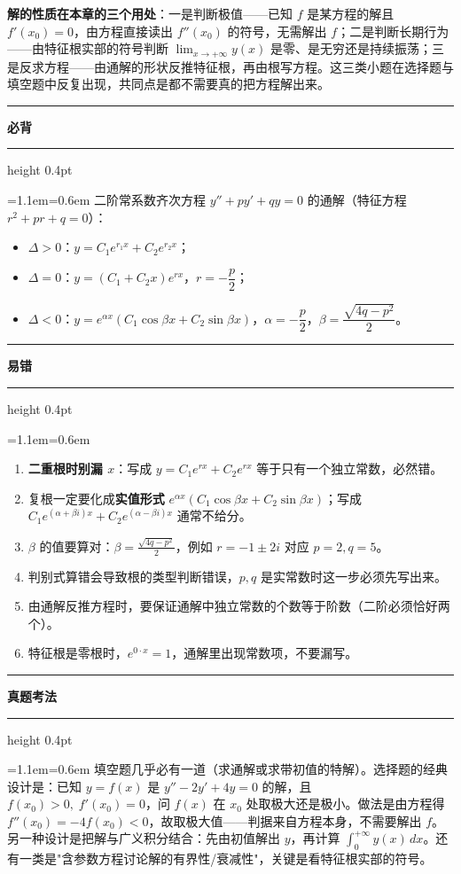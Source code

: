 \documentclass[11pt,openany,UTF8]{ctexbook}
\newcommand{\callouthead}[2]{%
  \par\addvspace{7pt}\noindent
  {\color{#1}\rule[-0.15em]{3pt}{1.05em}}\hspace{0.5em}%
  {\bfseries\color{#1}#2}\par\nobreak\vspace{-0.35em}%
  {\color{rulesep}\hrule height 0.4pt}\nobreak\vspace{0.45em}%
  \begingroup\small\setlength{\parindent}{0pt}%
  \leftskip=1.1em\rightskip=0.6em\noindent\ignorespaces}
\newcommand{\calloutend}{\par\endgroup\addvspace{7pt}}
\newenvironment{callkey}[1]{\callouthead{keybar}{#1}}{\calloutend}
\newenvironment{callwarn}[1]{\callouthead{warnbar}{#1}}{\calloutend}
\newenvironment{callexam}[1]{\callouthead{exambar}{#1}}{\calloutend}
\begin{document}
\textbf{解的性质在本章的三个用处}：一是判断极值——已知 $f$ 是某方程的解且 $f'(x_0)=0$，由方程直接读出 $f''(x_0)$ 的符号，无需解出 $f$；二是判断长期行为——由特征根实部的符号判断 $\lim_{x\to+\infty}y(x)$ 是零、是无穷还是持续振荡；三是反求方程——由通解的形状反推特征根，再由根写方程。这三类小题在选择题与填空题中反复出现，共同点是都不需要真的把方程解出来。

\begin{callkey}{必背}
二阶常系数齐次方程 $y''+py'+qy=0$ 的通解（特征方程 $r^{2}+pr+q=0$）：

\begin{itemize}
\item $\Delta>0$：$y=C_1e^{r_1x}+C_2e^{r_2x}$；
\item $\Delta=0$：$y=(C_1+C_2x)e^{rx}$，$r=-\dfrac p2$；
\item $\Delta<0$：$y=e^{\alpha x}\left(C_1\cos\beta x+C_2\sin\beta x\right)$，$\alpha=-\dfrac p2$，$\beta=\dfrac{\sqrt{4q-p^{2}}}{2}$。
\end{itemize}
\end{callkey}

\begin{callwarn}{易错}
\begin{enumerate}
\item \textbf{二重根时别漏 $x$}：写成 $y=C_1e^{rx}+C_2e^{rx}$ 等于只有一个独立常数，必然错。
\item 复根一定要化成\textbf{实值形式} $e^{\alpha x}(C_1\cos\beta x+C_2\sin\beta x)$；写成 $C_1e^{(\alpha+\beta i)x}+C_2e^{(\alpha-\beta i)x}$ 通常不给分。
\item $\beta$ 的值要算对：$\beta=\frac{\sqrt{4q-p^{2}}}{2}$，例如 $r=-1\pm2i$ 对应 $p=2,q=5$。
\item 判别式算错会导致根的类型判断错误，$p,q$ 是实常数时这一步必须先写出来。
\item 由通解反推方程时，要保证通解中独立常数的个数等于阶数（二阶必须恰好两个）。
\item 特征根是零根时，$e^{0\cdot x}=1$，通解里出现常数项，不要漏写。
\end{enumerate}
\end{callwarn}

\begin{callexam}{真题考法}
填空题几乎必有一道（求通解或求带初值的特解）。选择题的经典设计是：已知 $y=f(x)$ 是 $y''-2y'+4y=0$ 的解，且 $f(x_0)>0,\;f'(x_0)=0$，问 $f(x)$ 在 $x_0$ 处取极大还是极小。做法是由方程得 $f''(x_0)=-4f(x_0)<0$，故取极大值——判据来自方程本身，不需要解出 $f$。另一种设计是把解与广义积分结合：先由初值解出 $y$，再计算 $\int_0^{+\infty}y(x)\,dx$。还有一类是"含参数方程讨论解的有界性/衰减性"，关键是看特征根实部的符号。

\end{callexam}
\end{document}
